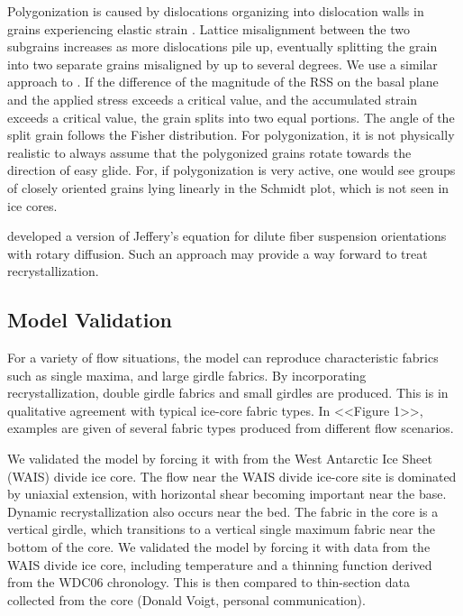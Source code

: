 \documentclass{igs}
\begin{document}
Polygonization is caused by dislocations organizing into dislocation walls in grains experiencing elastic strain \citep{duval1995}. Lattice misalignment between the two subgrains increases as more dislocations pile up, eventually splitting the grain into two separate grains misaligned by up to several degrees. We use a similar approach to \citet{thorsteinsson2002nni}. If the difference of the magnitude of the RSS on the basal plane and the applied stress exceeds a critical value, and the accumulated strain exceeds a critical value, the grain splits into two equal portions. The angle of the split grain follows the Fisher distribution. For polygonization, it is not physically realistic to always assume that the polygonized grains rotate towards the direction of easy glide. For, if polygonization is very active, one would see groups of closely oriented grains lying linearly in the Schmidt plot, which is not seen in ice cores. 


\citet{folgar1984} developed a version of Jeffery's equation for dilute fiber suspension orientations with rotary diffusion. Such an approach may provide a way forward to treat recrystallization. 

\subsection{Model Validation}
For a variety of flow situations, the model can reproduce characteristic fabrics such as single maxima, and large girdle fabrics. By incorporating recrystallization, double girdle fabrics and small girdles are produced. This is in qualitative agreement with typical ice-core fabric types. In <<Figure 1>>, examples are given of several fabric types produced from different flow scenarios. 

We validated the model by forcing it with from the West Antarctic Ice Sheet (WAIS) divide ice core. The flow near the WAIS divide ice-core site is dominated by uniaxial extension, with horizontal shear becoming important near the base. Dynamic recrystallization also occurs near the bed. The fabric in the core is a vertical girdle, which transitions to a vertical single maximum fabric near the bottom of the core. We validated the model by forcing it with data from the WAIS divide ice core, including temperature and a thinning function derived from the WDC06 chronology. This is then compared to thin-section data collected from the core (Donald Voigt, personal communication).
\end{document}
